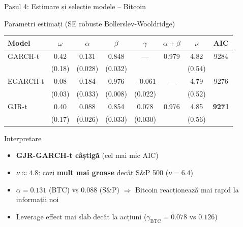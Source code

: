 \documentclass[9pt, aspectratio=169, t]{beamer}
\begin{document}
\begin{frame}{Pasul 4: Estimare și selecție modele -- Bitcoin}
    \small
        \begin{block}{Parametri estimați (SE robuste Bollerslev-Wooldridge)}
            \begin{center}
            \begin{tabular}{lccccccc}
                \toprule
                \textbf{Model} & $\omega$ & $\alpha$ & $\beta$ & $\gamma$ & $\alpha\!+\!\beta$ & $\nu$ & \textbf{AIC} \\
                \midrule
                GARCH-t & 0.42 & 0.131 & 0.848 & --- & 0.979 & 4.82 & 9284 \\
                         & \tiny{(0.18)} & \tiny{(0.028)} & \tiny{(0.032)} & & & \tiny{(0.54)} & \\
                EGARCH-t & 0.08 & 0.184 & 0.976 & $-$0.061 & --- & 4.79 & 9276 \\
                          & \tiny{(0.03)} & \tiny{(0.033)} & \tiny{(0.008)} & \tiny{(0.022)} & & \tiny{(0.52)} & \\
                GJR-t & 0.40 & 0.088 & 0.854 & 0.078 & 0.976 & 4.85 & \textbf{9271} \\
                       & \tiny{(0.17)} & \tiny{(0.026)} & \tiny{(0.033)} & \tiny{(0.030)} & & \tiny{(0.56)} & \\
                \bottomrule
            \end{tabular}
            \end{center}
        \end{block}
        \begin{block}{Interpretare}
            \begin{itemize}
                \item \textbf{GJR-GARCH-t câștigă} (cel mai mic AIC)
                \item $\nu \approx 4.8$: cozi \textbf{mult mai groase} decât S\&P 500 ($\nu = 6.4$)
                \item $\alpha = 0.131$ (BTC) vs $0.088$ (S\&P) $\Rightarrow$ Bitcoin reacționează mai rapid la informații noi
                \item Leverage effect mai slab decât la acțiuni ($\gamma_{\text{BTC}} = 0.078$ vs $0.126$)
            \end{itemize}
        \end{block}
\end{frame}
\end{document}
